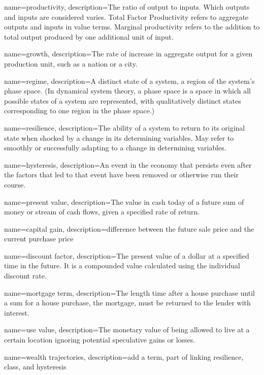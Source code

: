 {
name=productivity,
description={The ratio of output to inputs. Which outputs and inputs are considered varies. Total Factor Productivity refers to aggregate outputs and inputs in value terms. Marginal productivity refers to the addition to total output produced by one additional unit of input.} 
}

{
name=growth,
description={The rate of increase in aggregate output for a given production unit, such as a nation  or a city.}
}

{
name=regime,
description={A distinct state of a system, a region of the system's phase space. (In dynamical system theory, a phase space is a space in which all possible states of a system are represented, with qualitatively distinct  states corresponding to one region in the phase space.)}
}

{
name=resilience,
description={The ability of a system to return to its original state when shocked by a change in its determining variables. May refer to smoothly or successfully adapting to a change in  determining variables. }
}

{
name=hysteresis,
description={An event in the economy that persists even after the factors that led to that event have been removed or otherwise run their course.}
}

{
name=present value,
description={The value in cash today of a future sum of money or stream of cash flows, given a specified rate of return.}
}

{
name=capital gain,
description={difference between the future sale price and the current purchase price}
}

{
name=discount factor,
description={The present value of a dollar at a specified time in the future. It is a compounded value calculated using the individual discount rate.}
}

{
name=mortgage term,
description={The length time after a house purchase until a sum for a house purchase, the mortgage, must be returned to the lender with interest.}
}

{
name=use value,
description={The monetary value of being allowed to live at a certain location ignoring potential speculative gains or losses. }
}

{
name=wealth trajectories,
description={add a term, part of linking resilience, class, and hysteresis}
}

